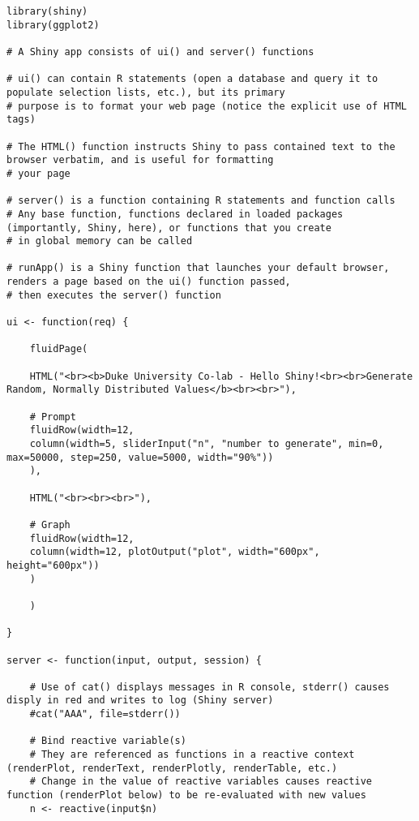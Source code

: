 \documentclass[10pt, letterpaper]{article}
\begin{document}
\begin{spacing}{1.0}
\begin{verbatim}
library(shiny)
library(ggplot2)

# A Shiny app consists of ui() and server() functions

# ui() can contain R statements (open a database and query it to populate selection lists, etc.), but its primary
# purpose is to format your web page (notice the explicit use of HTML tags)

# The HTML() function instructs Shiny to pass contained text to the browser verbatim, and is useful for formatting
# your page

# server() is a function containing R statements and function calls 
# Any base function, functions declared in loaded packages (importantly, Shiny, here), or functions that you create
# in global memory can be called

# runApp() is a Shiny function that launches your default browser, renders a page based on the ui() function passed,
# then executes the server() function

ui <- function(req) {
    
    fluidPage(
    
    HTML("<br><b>Duke University Co-lab - Hello Shiny!<br><br>Generate Random, Normally Distributed Values</b><br><br>"),
    
    # Prompt
    fluidRow(width=12,
    column(width=5, sliderInput("n", "number to generate", min=0, max=50000, step=250, value=5000, width="90%"))
    ),
    
    HTML("<br><br><br>"),
    
    # Graph
    fluidRow(width=12,
    column(width=12, plotOutput("plot", width="600px", height="600px"))
    )
    
    )
    
}

server <- function(input, output, session) {
    
    # Use of cat() displays messages in R console, stderr() causes disply in red and writes to log (Shiny server)
    #cat("AAA", file=stderr())
    
    # Bind reactive variable(s)
    # They are referenced as functions in a reactive context (renderPlot, renderText, renderPlotly, renderTable, etc.)
    # Change in the value of reactive variables causes reactive function (renderPlot below) to be re-evaluated with new values
    n <- reactive(input$n)
    

\end{verbatim}
\end{spacing}
\end{document}
